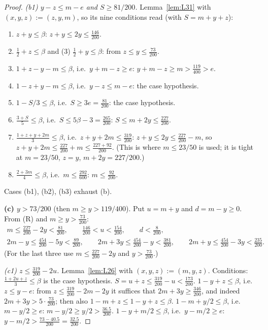 \documentclass[11pt]{amsart}
\theoremstyle{definition}
\theoremstyle{remark}
\begin{document}
\begin{proof}
\emph{(b1) $y-z\le m-e$ and $S\ge81/200$.} Lemma~\ref{lem:L31} with $(x,y,z):=(z,y,m)$, so its nine conditions read (with $S=m+y+z$):
\begin{enumerate}
\item $z+y\le\beta$: $z+y\le2y\le\tfrac{146}{200}$.
\item $\tfrac12+z\le\beta$ and (3) $\tfrac12+y\le\beta$: from $z\le y\le\tfrac{73}{200}$.
\setcounter{enumi}{3}
\item $1+z-y-m\le\beta$, i.e.\ $y+m-z\ge e$: $y+m-z\ge m>\tfrac{119}{400}>e$.
\item $1-z+y-m\le\beta$, i.e.\ $y-z\le m-e$: the case hypothesis.
\item $1-S/3\le\beta$, i.e.\ $S\ge3e=\tfrac{81}{200}$: the case hypothesis.
\item $\tfrac{3+S}{5}\le\beta$, i.e.\ $S\le5\beta-3=\tfrac{265}{200}$: $S\le m+2y\le\tfrac{227}{200}$.
\item $\tfrac{1+z+y+2m}{3}\le\beta$, i.e.\ $z+y+2m\le\tfrac{319}{200}$: $z+y\le2y\le\tfrac{227}{200}-m$, so $z+y+2m\le\tfrac{227}{200}+m\le\tfrac{227+92}{200}$. (This is where $m\le23/50$ is used; it is tight at $m=23/50$, $z=y$, $m+2y=227/200$.)
\item $\tfrac{2+3m}{4}\le\beta$, i.e.\ $m\le\tfrac{292}{600}$: $m\le\tfrac{92}{200}$.
\end{enumerate}
Cases (b1), (b2), (b3) exhaust (b).

\medskip\noindent\textbf{(c) $y>73/200$} (then $m\ge y>119/400$). Put $u=m+y$ and $d=m-y\ge0$. From (R) and $m\ge y>\tfrac{73}{200}$:
\begin{equation*}\tag{C}
\begin{gathered}
m\le\tfrac{227}{200}-2y<\tfrac{81}{200},\qquad \tfrac{146}{200}<u<\tfrac{154}{200},\qquad d<\tfrac{8}{200},\\
2m-y\le\tfrac{454}{200}-5y<\tfrac{89}{200},\qquad 2m+3y\le\tfrac{454}{200}-y<\tfrac{381}{200},\qquad 2m+y\le\tfrac{454}{200}-3y<\tfrac{235}{200}.
\end{gathered}
\end{equation*}
(For the last three use $m\le\tfrac{227}{200}-2y$ and $y>\tfrac{73}{200}$.)

\emph{(c1) $z\le\tfrac{319}{200}-2u$.} Lemma~\ref{lem:L26} with $(x,y,z):=(m,y,z)$. Conditions: $\tfrac{1+2u+z}{3}\le\beta$ is the case hypothesis. $S=u+z\le\tfrac{319}{200}-u<\tfrac{173}{200}$. $1-y+z\le\beta$, i.e.\ $z\le y-e$: from $z\le\tfrac{319}{200}-2m-2y$ it suffices that $2m+3y\ge\tfrac{346}{200}$, and indeed $2m+3y>5\cdot\tfrac{73}{200}$; then also $1-m+z\le1-y+z\le\beta$. $1-m+y/2\le\beta$, i.e.\ $m-y/2\ge e$: $m-y/2\ge y/2>\tfrac{36.5}{200}$. $1-y+m/2\le\beta$, i.e.\ $y-m/2\ge e$: $y-m/2>\tfrac{73-40.5}{200}=\tfrac{32.5}{200}$.


\end{proof}
\end{document}

